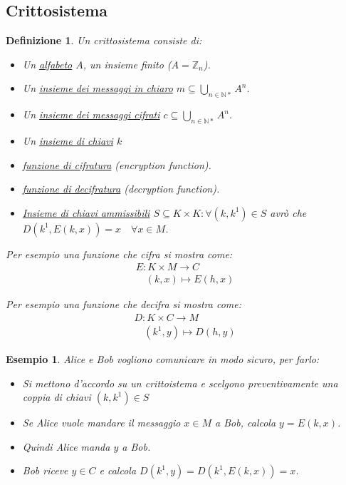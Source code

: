 \documentclass{article}
\newtheorem{exmp}{Esempio}[section]
\newtheorem{definition}{Definizione}[section]
\begin{document}
\subsection{Crittosistema}\label{sec:crittografia}
\begin{definition}
        Un crittosistema consiste di:
        \begin{itemize}
                \item Un \underline{alfabeto} $A$, un insieme finito ($A = \mathbb{Z}_n$).
                \item Un \underline{insieme dei messaggi in chiaro} $m \subseteq \bigcup_{n \in \mathbb{N}*}A^n$.
                \item Un \underline{insieme dei messaggi cifrati} $c \subseteq \bigcup_{n \in \mathbb{N}*}A^n$.
                \item Un \underline{insieme di chiavi} $k$
                \item \underline{funzione di cifratura} (encryption function).
                \item \underline{funzione di decifratura} (decryption function).
                \item \underline{Insieme di chiavi ammissibili} $S \subseteq K \times K : \forall(k,k^1) \in S$ avrò che \newline $D(k^1, E(k,x)) = x \quad \forall x \in M$. 
        \end{itemize}

        Per esempio una funzione che cifra si mostra come:
        \begin{align*}
                E : K \times M \to C \\
                \quad (k,x) \mapsto E(h,x)
        \end{align*}
        
        Per esempio una funzione che decifra si mostra come:
        \begin{align*}
                D : K \times C \to M \\
                \quad (k^1,y) \mapsto D(h,y)
        \end{align*}
\end{definition}

\begin{exmp}
       Alice e Bob vogliono comunicare in modo sicuro, per farlo:
       \begin{itemize}
               \item Si mettono d'accordo su un crittoistema e scelgono preventivamente una coppia di chiavi $(k, k^1) \in S$
               \item Se Alice vuole mandare il messaggio $x \in M$ a Bob, calcola $y = E(k,x)$.
               \item Quindi Alice manda $y$ a Bob.
               \item Bob riceve $y \in C$ e calcola $D(k^1,y)= D(k^1, E(k,x)) = x$.
       \end{itemize}
\end{exmp}
\end{document}
